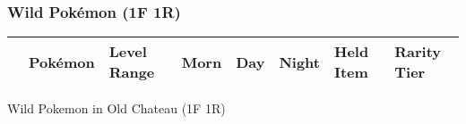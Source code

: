 \subsubsection{Wild Pokémon (1F 1R)}%
\label{ssubsec:WildPokmon(1F1R)}%
\begin{longtable}{||l l l l l l l l||}%
\hline%
&Pokémon&Level Range&Morn&Day&Night&Held Item&Rarity Tier\\%
\hline%
\endhead%
\hline%
\end{longtable}%
\caption{Wild Pokemon in Old Chateau (1F 1R)}